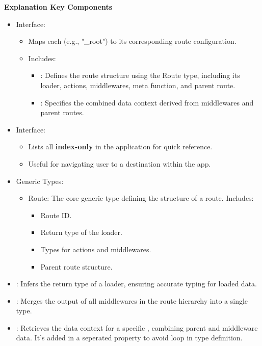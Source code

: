 \textbf{Explanation Key Components}
\begin{itemize}
  \item {} Interface:
  \begin{itemize}
    \item Maps each  (e.g., "\/\_root") to its corresponding route configuration.
    \item Includes:
    \begin{itemize}
      \item {}: Defines the route structure using the Route type, including its loader, actions, middlewares, meta function, and parent route.
      \item {}: Specifies the combined data context derived from middlewares and parent routes.
    \end{itemize}
  \end{itemize}


  \item {} Interface:
  \begin{itemize}
    \item Lists all \textbf{index-only}  in the application for quick reference.
    \item Useful for navigating user to a destination within the app.

  \end{itemize}

  \item Generic Types:
  \begin{itemize}
    \item Route: The core generic type defining the structure of a route. Includes:
    \begin{itemize}
      \item Route ID.
      \item  Return type of the loader.
      \item Types for actions and middlewares.
      \item Parent route structure.
    \end{itemize}
  \end{itemize}


  \item {}: Infers the return type of a loader, ensuring accurate typing for loaded data.
  \item {}: Merges the output of all middlewares in the route hierarchy into a single type.
  \item {}: Retrieves the data context for a specific , combining parent and middleware data. It's added in a seperated property to avoid loop in type definition.
\end{itemize}

